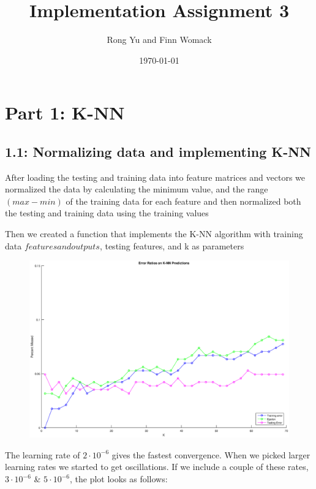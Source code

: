 \documentclass{article}
\title{Implementation Assignment 3}
\date{\today}
\author{Rong Yu and Finn Womack}
\begin{document}
	\maketitle
	\section*{Part 1: K-NN}
	\subsection*{1.1: Normalizing data and implementing K-NN}
After loading the testing and training data into feature matrices and vectors we normalized the data by calculating the minimum value, and the range $(max - min)$ of the training data for each feature and then normalized both the testing and training data using the training values
	
	Then we created a function that implements the K-NN algorithm with training data \( features and outputs\), testing features, and k as parameters
	
	\newpage
	
	\begin{figure}[h!]
		\begin{center} 
			\includegraphics[scale=0.4]{knn.eps} 
		\end{center} 
		\label{fig:M1}
	\end{figure}
	
	The learning rate of $2 \cdot 10^{-6}$ gives the fastest convergence. When we picked larger learning rates we started to get oscillations. If we include a couple of these rates, $3 \cdot 10^{-6}$ \& $5 \cdot 10^{-6}$, the plot looks as follows:
	
\end{document}
